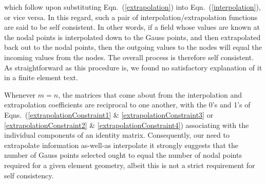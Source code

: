 which follow upon substituting Eqn.~(\ref{extrapolation}) into Eqn.~(\ref{interpolation}), or vice versa.  In this regard, such a pair of interpolation\slash extrapolation functions are said to be self consistent.  In other words, if a field whose values are known at the nodal points is interpolated down to the Gauss points, and then extrapolated back out to the nodal points, then the outgoing values to the nodes will equal the incoming values from the nodes.  The overall process is therefore self consistent.  As straight\-forward as this procedure is, we found no satisfactory explanation of it in a finite element text.

Whenever $m=n$, the matrices that come about from the interpolation and extrapolation coefficients are reciprocal to one another, with the 0's and 1's of Eqns.~(\ref{extrapolationConstraint1} \& \ref{extrapolationConstraint3} or \ref{extrapolationConstraint2} \& \ref{extrapolationConstraint4}) associating with the individual components of an identity matrix.  Consequently, our need to extrapolate information as-well-as interpolate it strongly suggests that the number of Gauss points selected ought to equal the number of nodal points required for a given element geometry, albeit this is not a strict requirement for self consistency.

